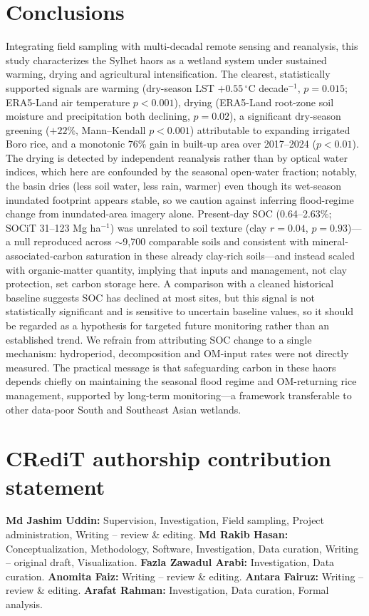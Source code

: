 \documentclass[preprint,authoryear,12pt]{elsarticle}
\begin{document}
\section{Conclusions}
\label{sec:conclusion}
Integrating field sampling with multi-decadal remote sensing and reanalysis, this study
characterizes the Sylhet haors as a wetland system under sustained warming, drying and
agricultural intensification. The clearest, statistically supported signals are warming
(dry-season LST $+0.55\,^{\circ}$C decade$^{-1}$, $p=0.015$; ERA5-Land air temperature
$p<0.001$), drying (ERA5-Land root-zone soil moisture and precipitation both declining,
$p=0.02$), a significant dry-season greening ($+22$\%, Mann--Kendall $p<0.001$) attributable to
expanding irrigated Boro rice, and a monotonic $76$\% gain in built-up area over 2017--2024
($p<0.01$). The drying is detected by independent reanalysis rather than by optical water
indices, which here are confounded by the seasonal open-water fraction; notably, the basin dries
(less soil water, less rain, warmer) even though its wet-season inundated footprint appears
stable, so we caution against inferring flood-regime change from inundated-area imagery alone.
Present-day SOC
(0.64--2.63\%; SOCiT 31--123 Mg ha$^{-1}$) was unrelated to soil texture (clay $r=0.04$,
$p=0.93$)---a null reproduced across $\sim$9{,}700 comparable soils and consistent with
mineral-associated-carbon saturation in these already clay-rich soils---and instead scaled with
organic-matter quantity, implying that inputs and management, not clay protection, set carbon
storage here. A comparison with a cleaned historical baseline suggests SOC has
declined at most sites, but this signal is not statistically significant and is sensitive to
uncertain baseline values, so it should be regarded as a hypothesis for targeted future
monitoring rather than an established trend. We refrain from attributing SOC change to a
single mechanism: hydroperiod, decomposition and OM-input rates were not directly measured.
The practical message is that safeguarding carbon in these haors depends chiefly on
maintaining the seasonal flood regime and OM-returning rice management, supported by long-term
monitoring---a framework transferable to other data-poor South and Southeast Asian wetlands.

\section*{CRediT authorship contribution statement}
\textbf{Md Jashim Uddin:} Supervision, Investigation, Field sampling, Project administration,
Writing -- review \& editing. \textbf{Md Rakib Hasan:} Conceptualization, Methodology,
Software, Investigation, Data curation, Writing -- original draft, Visualization.
\textbf{Fazla Zawadul Arabi:} Investigation, Data curation. \textbf{Anomita Faiz:}
Writing -- review \& editing. \textbf{Antara Fairuz:} Writing -- review \& editing.
\textbf{Arafat Rahman:} Investigation, Data curation, Formal analysis.
\end{document}
